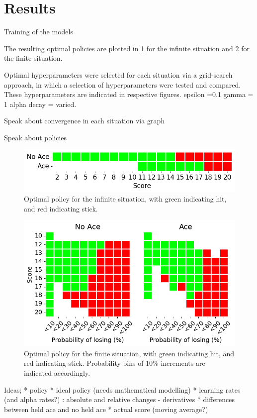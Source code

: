 \section{Results}

Training of the models 

The resulting optimal policies are plotted in \ref{fig: Optimal policy - Infinite} for the infinite situation and \ref{fig: Optimal policy - Finite} for the finite situation.  

Optimal hyperparameters were selected for each situation via a grid-search approach, in which a selection of hyperparameters were tested and compared. These hyperparameters are indicated in respective figures. 
epsilon =0.1
gamma = 1
alpha decay = varied. 

Speak about convergence in each situation via graph

Speak about policies

\begin{figure}[ht] \label{fig: Optimal policy - Infinite} 
    \centering
    \includegraphics[width=\singlefigure]{figures/infinite_optimal_policy.png}
    \caption{Optimal policy for the infinite situation, with green indicating hit, and red indicating stick.}
\end{figure}

\begin{figure}[ht] \label{fig: Optimal policy - Finite} 
    \centering
    \includegraphics[width=\singlefigure]{figures/finite_optimal_policy.png}
    \caption{Optimal policy for the finite situation, with green indicating hit, and red indicating stick. Probability bins of 10\% increments are indicated accordingly.}
\end{figure}

Ideas;
* policy
* ideal policy (needs mathematical modelling)
* learning rates (and alpha rates?) : absolute and relative changes - derivatives
* differences between held ace and no held ace
* actual score (moving average?)